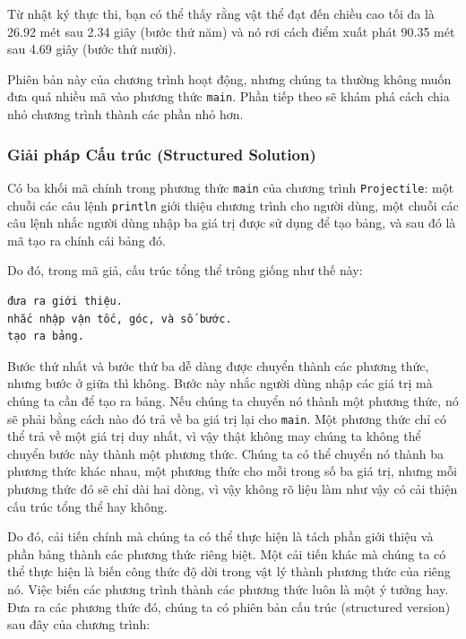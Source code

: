 Từ nhật ký thực thi, bạn có thể thấy rằng vật thể đạt đến chiều cao tối
đa là 26.92 mét sau 2.34 giây (bước thứ năm) và nó rơi cách điểm xuất
phát 90.35 mét sau 4.69 giây (bước thứ mười).

Phiên bản này của chương trình hoạt động, nhưng chúng ta thường không
muốn đưa quá nhiều mã vào phương thức \texttt{main}. Phần tiếp theo sẽ
khám phá cách chia nhỏ chương trình thành các phần nhỏ hơn.

\subsubsection{Giải pháp Cấu trúc (Structured
Solution)}\label{giux1ea3i-phuxe1p-cux1ea5u-truxfac-structured-solution}

Có ba khối mã chính trong phương thức \texttt{main} của chương trình
\texttt{Projectile}: một chuỗi các câu lệnh \texttt{println} giới thiệu
chương trình cho người dùng, một chuỗi các câu lệnh nhắc người dùng nhập
ba giá trị được sử dụng để tạo bảng, và sau đó là mã tạo ra chính cái
bảng đó.

Do đó, trong mã giả, cấu trúc tổng thể trông giống như thế này:

\begin{verbatim}
đưa ra giới thiệu.
nhắc nhập vận tốc, góc, và số bước.
tạo ra bảng.
\end{verbatim}

Bước thứ nhất và bước thứ ba dễ dàng được chuyển thành các phương thức,
nhưng bước ở giữa thì không. Bước này nhắc người dùng nhập các giá trị
mà chúng ta cần để tạo ra bảng. Nếu chúng ta chuyển nó thành một phương
thức, nó sẽ phải bằng cách nào đó trả về ba giá trị lại cho
\texttt{main}. Một phương thức chỉ có thể trả về một giá trị duy nhất,
vì vậy thật không may chúng ta không thể chuyển bước này thành một
phương thức. Chúng ta có thể chuyển nó thành ba phương thức khác nhau,
một phương thức cho mỗi trong số ba giá trị, nhưng mỗi phương thức đó sẽ
chỉ dài hai dòng, vì vậy không rõ liệu làm như vậy có cải thiện cấu trúc
tổng thể hay không.

Do đó, cải tiến chính mà chúng ta có thể thực hiện là tách phần giới
thiệu và phần bảng thành các phương thức riêng biệt. Một cải tiến khác
mà chúng ta có thể thực hiện là biến công thức độ dời trong vật lý thành
phương thức của riêng nó. Việc biến các phương trình thành các phương
thức luôn là một ý tưởng hay. Đưa ra các phương thức đó, chúng ta có
phiên bản cấu trúc (structured version) sau đây của chương trình:

